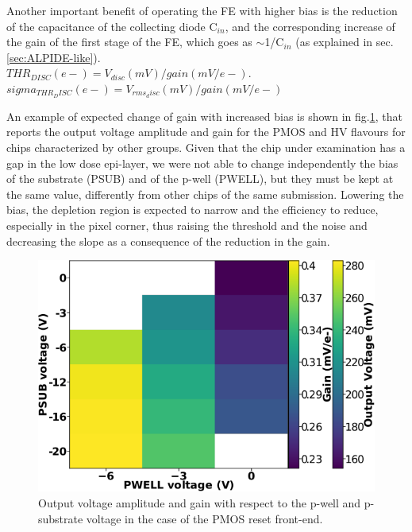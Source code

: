         Another important benefit of operating the FE with higher bias is the reduction of the capacitance of the collecting diode C$_{in}$, and the corresponding increase of the gain of the first stage of the FE, which goes as $\sim$1/C$_{in}$ (as explained in sec. \ref{sec:ALPIDE-like}). 
        \\
        $THR_{DISC} (e-) = V_{disc} (mV)/gain (mV/e-).$\\
        $sigma_{THR_DISC} (e-) = V_{rms_disc} (mV) / gain (mV/e-)$
    
        An example of expected change of gain with increased bias is shown in fig.\ref{fig:gain_vs_bias}, that reports the output voltage amplitude and gain for the PMOS and HV flavours for chips characterized by other groups.
        Given that the chip under examination has a gap in the low dose epi-layer, we were not able to change independently the bias of the substrate (PSUB) and of the p-well (PWELL), but they must be kept at the same value, differently from other chips of the same submission.
        Lowering the bias, the depletion region is expected to narrow and the efficiency to reduce, especially in the pixel corner, thus raising the threshold and the noise and decreasing the slope as a consequence of the reduction in the gain.
        \begin{figure}[h!]
            \centering
            \includegraphics[width=.5\linewidth]{figures/Monopix1/PMOS_gain_bias.png}          
            \caption{Output voltage amplitude and gain with respect to the p-well and p-substrate voltage in the case of the PMOS reset front-end.  }
            \label{fig:gain_vs_bias}
        \end{figure}  

